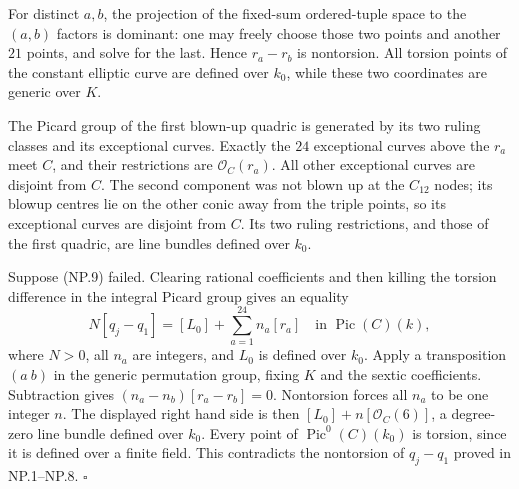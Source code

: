 For distinct $a,b$, the projection of the fixed-sum ordered-tuple
space to the $(a,b)$ factors is dominant: one may freely choose
those two points and another $21$ points, and solve for the last.
Hence $r_a-r_b$ is nontorsion. All torsion points of the constant
elliptic curve are defined over $k_0$, while these two coordinates
are generic over $K$.

The Picard group of the first blown-up quadric is generated by its
two ruling classes and its exceptional curves. Exactly the $24$
exceptional curves above the $r_a$ meet $C$, and their restrictions
are $\mathcal O_C(r_a)$. All other exceptional curves are disjoint
from $C$. The second component was not blown up at the $C_{12}$
nodes; its blowup centres lie on the other conic away from the
triple points, so its exceptional curves are disjoint from $C$.
Its two ruling restrictions, and those of the first quadric, are
line bundles defined over $k_0$.

Suppose (NP.9) failed. Clearing rational coefficients and then
killing the torsion difference in the integral Picard group gives
an equality
\[
 N[q_j-q_1]=[L_0]+\sum_{a=1}^{24} n_a[r_a]
 \quad\text{in }\operatorname{Pic}(C)(k),
\]
where $N>0$, all $n_a$ are integers, and $L_0$ is defined over
$k_0$. Apply a transposition $(a\ b)$ in the generic permutation
group, fixing $K$ and the sextic coefficients. Subtraction gives
$(n_a-n_b)[r_a-r_b]=0$. Nontorsion forces all $n_a$ to be one
integer $n$. The displayed right hand side is then
$[L_0]+n[\mathcal O_C(6)]$, a degree-zero line bundle defined over
$k_0$. Every point of $\operatorname{Pic}^0(C)(k_0)$ is torsion,
since it is defined over a finite field. This contradicts the
nontorsion of $q_j-q_1$ proved in NP.1--NP.8.
\hfill$\square$
